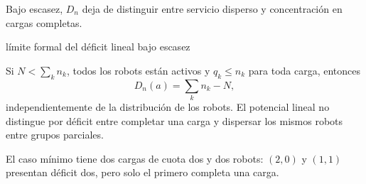 Bajo escasez, \(D_n\) deja de distinguir entre servicio disperso y concentración en cargas completas.
\begin{contribucion}{límite formal del déficit lineal bajo escasez}
\begin{proposicion}
\label{thm:sp1-scarcity-degeneracy}
Si $N<\sum_kn_k$, todos los robots están activos y $q_k\leq n_k$ para toda carga, entonces
\[
 D_n(a)=\sum_kn_k-N,
\]
independientemente de la distribución de los robots. El potencial lineal no distingue por déficit entre completar una carga y dispersar los mismos robots entre grupos parciales.
\end{proposicion}
\end{contribucion}

El caso mínimo tiene dos cargas de cuota dos y dos robots: $(2,0)$ y $(1,1)$ presentan déficit dos, pero solo el primero completa una carga.


